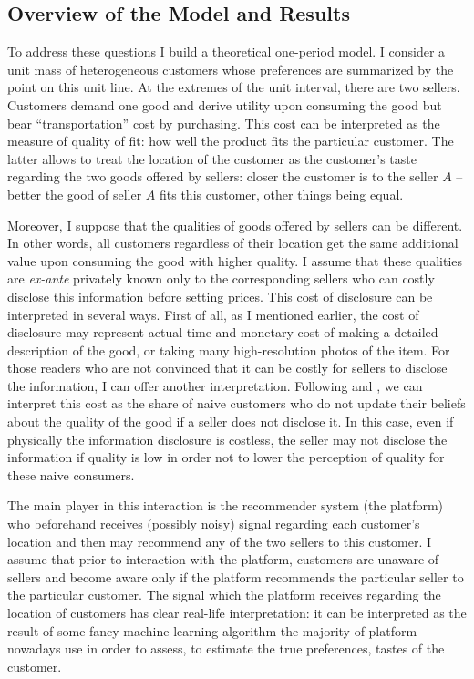 \documentclass[a4paper]{article}
\begin{document}
 
 	\subsection{Overview of the Model and Results}
	To address these questions I build a theoretical one-period model. I consider a unit mass of heterogeneous customers whose preferences are summarized by the point on this unit line. At the extremes of the unit interval, there are two sellers. Customers demand one good and derive utility upon consuming the good but bear ``transportation'' cost by purchasing. This cost can be interpreted as the measure of quality of fit: how well the product fits the particular customer. The latter allows to treat the location of the customer as the customer's taste regarding the two goods offered by sellers: closer the customer is to the seller $A$ -- better the good of seller $A$ fits this customer, other things being equal. 
	
	
	
	
	Moreover, I suppose that the qualities of goods offered by sellers can be different. In other words, all customers regardless of their location get the same additional value upon consuming the good with higher quality. I assume that these qualities are \textit{ex-ante} privately known only to the corresponding sellers who can costly disclose this information before setting prices. This cost of disclosure can be interpreted in several ways. First of all, as I mentioned earlier, the cost of disclosure may represent actual time and monetary cost of making a detailed description of the good, or taking many high-resolution photos of the item. For those readers who are not convinced that it can be costly for sellers to disclose the information, I can offer another interpretation. Following \cite{levin2009quality} and \cite{hirshleifer2002disclosure}, we can interpret this cost as the share of naive customers who do not update their beliefs about the quality of the good if a seller does not disclose it. In this case, even if physically the information disclosure is costless, the seller may not disclose the information if quality is low in order not to lower the perception of quality for these naive consumers.
	 
	
	
	
	
	The main player in this interaction is the recommender system (the platform) who beforehand receives (possibly noisy) signal regarding each customer's location and then may recommend any of the two sellers to this customer. I assume that prior to interaction with the platform, customers are unaware of sellers and become aware only if the platform recommends the particular seller to the particular customer. The signal which the platform receives regarding the location of customers has clear real-life interpretation: it can be interpreted as the result of some fancy machine-learning algorithm the majority of platform nowadays use in order to assess, to estimate the true preferences, tastes of the customer. 
	
\end{document}
